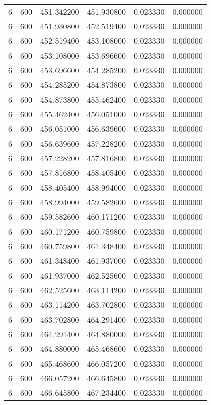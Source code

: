 \begin{longtable}{rrrrrr}
6 & 600 & 451.342200 & 451.930800 & 0.023330 & 0.000000 \\
6 & 600 & 451.930800 & 452.519400 & 0.023330 & 0.000000 \\
6 & 600 & 452.519400 & 453.108000 & 0.023330 & 0.000000 \\
6 & 600 & 453.108000 & 453.696600 & 0.023330 & 0.000000 \\
6 & 600 & 453.696600 & 454.285200 & 0.023330 & 0.000000 \\
6 & 600 & 454.285200 & 454.873800 & 0.023330 & 0.000000 \\
6 & 600 & 454.873800 & 455.462400 & 0.023330 & 0.000000 \\
6 & 600 & 455.462400 & 456.051000 & 0.023330 & 0.000000 \\
6 & 600 & 456.051000 & 456.639600 & 0.023330 & 0.000000 \\
6 & 600 & 456.639600 & 457.228200 & 0.023330 & 0.000000 \\
6 & 600 & 457.228200 & 457.816800 & 0.023330 & 0.000000 \\
6 & 600 & 457.816800 & 458.405400 & 0.023330 & 0.000000 \\
6 & 600 & 458.405400 & 458.994000 & 0.023330 & 0.000000 \\
6 & 600 & 458.994000 & 459.582600 & 0.023330 & 0.000000 \\
6 & 600 & 459.582600 & 460.171200 & 0.023330 & 0.000000 \\
6 & 600 & 460.171200 & 460.759800 & 0.023330 & 0.000000 \\
6 & 600 & 460.759800 & 461.348400 & 0.023330 & 0.000000 \\
6 & 600 & 461.348400 & 461.937000 & 0.023330 & 0.000000 \\
6 & 600 & 461.937000 & 462.525600 & 0.023330 & 0.000000 \\
6 & 600 & 462.525600 & 463.114200 & 0.023330 & 0.000000 \\
6 & 600 & 463.114200 & 463.702800 & 0.023330 & 0.000000 \\
6 & 600 & 463.702800 & 464.291400 & 0.023330 & 0.000000 \\
6 & 600 & 464.291400 & 464.880000 & 0.023330 & 0.000000 \\
6 & 600 & 464.880000 & 465.468600 & 0.023330 & 0.000000 \\
6 & 600 & 465.468600 & 466.057200 & 0.023330 & 0.000000 \\
6 & 600 & 466.057200 & 466.645800 & 0.023330 & 0.000000 \\
6 & 600 & 466.645800 & 467.234400 & 0.023330 & 0.000000 \\

\end{longtable}
